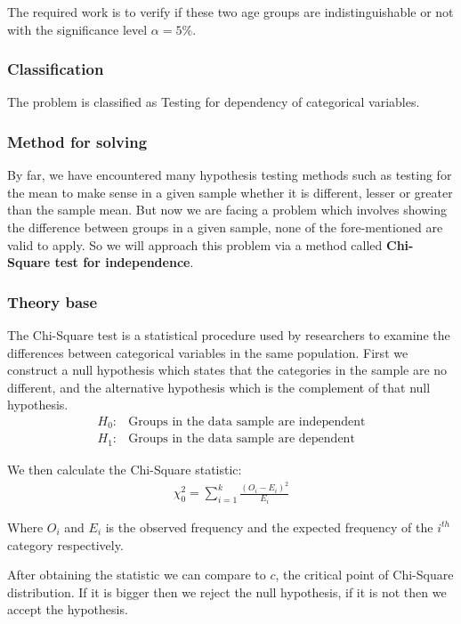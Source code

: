 \documentclass[a4paper]{article}
\numberwithin{equation}{section}
\begin{document}
The required work is to verify if these two age groups are indistinguishable or not with the significance level \( \alpha = 5\% \).

\subsubsection{Classification}
The problem is classified as Testing for dependency of categorical variables.

\subsubsection{Method for solving}
By far, we have encountered many hypothesis testing methods such as testing for the mean to make sense in a given sample whether it is different, lesser or greater than the sample mean. But now we are facing a problem which involves showing the difference between groups in a given sample, none of the fore-mentioned are valid to apply. So we will approach this problem via a method called \textbf{Chi-Square test for independence}.

\subsubsection{Theory base}\label{p2:theory}
The Chi-Square test is a statistical procedure used by researchers to examine the differences between categorical variables in the same population. First we construct a null hypothesis which states that the categories in the sample are no different, and the alternative hypothesis which is the complement of that null hypothesis.
\begin{align*}
  H_0: & \text{Groups in the data sample are independent} \\
  H_1: & \text{Groups in the data sample are dependent}
\end{align*}

We then calculate the Chi-Square statistic:
\begin{align*}
  \chi_0^2 = \sum_{i = 1}^{k} \frac{{(O_i - E_i)}^2}{E_i}
\end{align*}\label{chi:stat}

Where \(O_i\) and \(E_i\) is the observed frequency and the expected frequency of the \(i^{th}\) category respectively.

After obtaining the statistic we can compare to \(c\), the critical point of Chi-Square distribution. If it is bigger then we reject the null hypothesis, if it is not then we accept the hypothesis.
\end{document}
